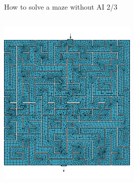 \documentclass[
  ignorenonframetext,
  aspectratio=169,
]{beamer}
\begin{document}
\begin{frame}[fragile]{How to solve a maze without AI 2/3}
\begin{columns}[T]
\begin{column}{0.5\textwidth}
\centering\includegraphics[height=8cm]{maze2.png}
\end{column}
\end{columns}
\end{frame}
\end{document}
